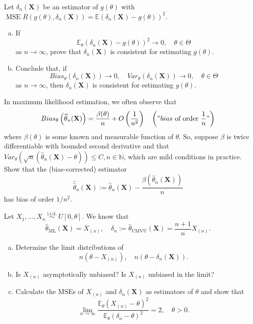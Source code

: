 \begin{ex}
    Let \(\delta_{n}(\mathbf{X})\) be an estimator of \(g(\theta)\) with \(\operatorname{MSE} R\left(g(\theta), \delta_{n}(\mathbf{X})\right)=\mathbb{E}\left(\delta_{n}(\mathbf{X})-g(\theta)\right)^{2}\). 
    \begin{enumerate}[(a)]
        \item If
        \[
            \mathbb{E}_{\theta}\left(\delta_{n}(\mathbf{X})-g(\theta)\right)^{2} \rightarrow 0, \quad \theta \in \Theta
        \]
        as \(n \rightarrow \infty\), prove that \(\delta_{n}(\mathbf{X})\) is consistent for estimating \(g(\theta)\). 
        \item Conclude that, if
        \[
            Bias_{\theta}\left(\delta_{n}(\mathbf{X})\right) \rightarrow 0, \quad Var_{\theta}\left(\delta_{n}(\mathbf{X})\right) \rightarrow 0, \quad \theta \in \Theta
        \]
        as \(n \rightarrow \infty\), then \(\delta_{n}(\mathbf{X})\) is consistent for estimating \(g(\theta)\). 
    \end{enumerate}
\end{ex}

\begin{ex}
    In maximum likelihood estimation, we often observe that
    \[
        Bias_{\theta}\left(\widehat{\theta}_{n}(\mathbf{X})\right)=\frac{\beta(\theta)}{n}+O\left(\frac{1}{n^{2}}\right) \quad\left(" b i a s \text { of order } \frac{1}{n} "\right)
    \]
    where \(\beta(\theta)\) is some known and measurable function of \(\theta\). So, suppose \(\beta\) is twice differentiable with bounded second derivative and that \(Var_{\theta}\left(\sqrt{n}\left(\widehat{\theta}_{n}(\mathbf{X})-\theta\right)\right) \leq C, n \in \mathbb{N}\), which are mild conditions in practice. Show that the (bias-corrected) estimator
    \[
        \widehat{\widehat{\theta}}_{n}(\mathbf{X}):=\widehat{\theta}_{n}(\mathbf{X})-\frac{\beta\left(\widehat{\theta}_{n}(\mathbf{X})\right)}{n}
    \]
    has bias of order \(1 / n^{2}\). 
\end{ex}


\begin{ex}
    Let \(X_{1}, \ldots, X_{n} \stackrel{\text { i.i.d. }}{\sim} U[0, \theta]\). We know that
    \[
        \widehat{\theta}_{\mathrm{ML}}(\mathbf{X})=X_{(n)}, \quad \delta_{n}:=\widehat{\theta}_{\mathrm{UMVU}}(\mathbf{X})=\frac{n+1}{n} X_{(n)}. 
    \]
    \begin{enumerate}[(a)]
        \item Determine the limit distributions of
        \[
            n\left(\theta-X_{(n)}\right), \quad n\left(\theta-\delta_{n}(\mathbf{X})\right). 
        \]
        \item Is \(X_{(n)}\) asymptotically unbiased? Is \(X_{(n)}\) unbiased in the limit? 
        \item Calculate the MSEs of \(X_{(n)}\) and \(\delta_{n}(\mathbf{X})\) as estimators of \(\theta\) and show that
        \[
            \lim _{n \rightarrow \infty} \frac{\mathbb{E}_{\theta}\left(X_{(n)}-\theta\right)^{2}}{\mathbb{E}_{\theta}\left(\delta_{n}-\theta\right)^{2}}=2, \quad \theta>0. 
        \]
    \end{enumerate}
\end{ex}

